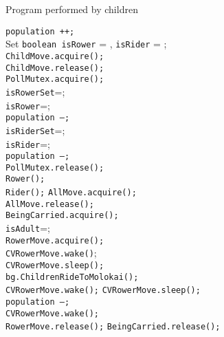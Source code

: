 \documentclass{article}
\begin{document}
\begin{spacing}{1.1}
\begin{algorithm}
\caption{Program performed by children}
\begin{algorithmic}[1]
  \STATE \texttt{population ++;}\\
  \STATE Set \texttt{boolean isRower} = \FALSE, \texttt{isRider} = \FALSE;\\
  \STATE \texttt{ChildMove.acquire();}\\
  \STATE \texttt{ChildMove.release();}\\
  \STATE \texttt{PollMutex.acquire();}\\
   \STATE \texttt{isRowerSet}=\TRUE;\\
  \STATE \texttt{isRower}=\TRUE;\\
  \STATE \texttt{population --;}\\
  \STATE \texttt{isRiderSet}=\TRUE;\\
  \STATE \texttt{isRider}=\TRUE;\\
  \STATE \texttt{population --;}\\
  \ENDIF
  \STATE \texttt{PollMutex.release();}\\
  \STATE \texttt{Rower();}\\
  \RETURN
  \STATE \texttt{Rider();}
  \RETURN
  \ELSE
  \STATE \texttt{AllMove.acquire();}\\
  \STATE \texttt{AllMove.release();}\\
  \STATE \texttt{BeingCarried.acquire();}\\
  \STATE \texttt{isAdult}=\FALSE;\\
  \STATE \texttt{RowerMove.acquire();}\\
  \STATE \texttt{CVRowerMove.wake()};\\
  \STATE \texttt{CVRowerMove.sleep();}\\
  \STATE \texttt{bg.ChildrenRideToMolokai();}\\
  \STATE \texttt{CVRowerMove.wake();}
  \STATE \texttt{CVRowerMove.sleep();}\\
  \STATE \texttt{population --;}\\
  \STATE \texttt{CVRowerMove.wake();}\\
  \STATE \texttt{RowerMove.release();}
  \STATE \texttt{BeingCarried.release();}
  \RETURN
  \ENDIF
\end{algorithmic}
\end{algorithm}


\end{spacing}
\end{document}
